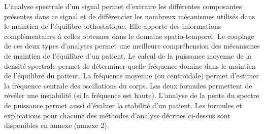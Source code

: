 L’analyse spectrale d’un signal permet d’extraire les différentes composantes présentes dans ce signal et de différencier les nombreux mécanismes utilisés dans le maintien de l’équilibre orthostatique. 
Elle apporte des informations complémentaires à celles obtenues dans le domaine spatio-temporel. 
Le couplage de ces deux types d’analyses permet une meilleure compréhension des mécanismes de maintien de l’équilibre d’un patient. 
Le calcul de la puissance moyenne de la densité spectrale permet de déterminer quelle fréquence domine dans le maintien de l’équilibre du patient. 
La fréquence moyenne (ou centroïdale) permet d’estimer la fréquence centrale des oscillations du corps. 
Les deux formules permettent de révéler une instabilité (si la fréquence est haute). 
L’analyse de la pente du spectre de puissance permet aussi d’évaluer la stabilité d’un patient.
Les formules et explications pour chacune des méthodes d’analyse décrites ci-dessus sont disponibles en annexe (annexe 2).

